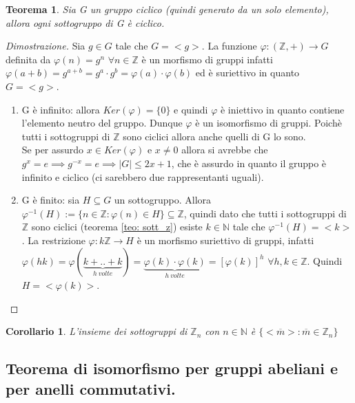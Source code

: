\documentclass{article}
\theoremstyle{definition}
\theoremstyle{plain}
\theoremstyle{plain}
\newtheorem{corollario}{Corollario}
\theoremstyle{plain}
\newtheorem{teorema}{Teorema}
\theoremstyle{plain}
\begin{document}
\begin{teorema}\label{teo:sott_cicl}
    Sia G un gruppo ciclico (quindi generato da un solo elemento), allora ogni sottogruppo di G è ciclico. 
\end{teorema}
\begin{proof}[Dimostrazione]
    Sia $g \in G$ tale che $G = <g>$.
    La funzione $\varphi : (\mathbb{Z}, +) \rightarrow G$ definita da $\varphi (n) = g^n$ $\forall n \in \mathbb{Z}$ è un morfismo di gruppi infatti $\varphi(a+b) = g^{a+b} = g^a \cdot g^b = \varphi(a) \cdot \varphi(b)$ ed è suriettivo in quanto $G = <g>$.
    \begin{enumerate}
        \item G è infinito: allora $Ker(\varphi) = \{0\}$ e quindi $\varphi$ è iniettivo in quanto contiene l'elemento neutro del gruppo. Dunque $\varphi$ è un isomorfismo di gruppi. Poichè tutti i sottogruppi di $\mathbb{Z}$ sono ciclici allora anche quelli di G lo sono.\\
        Se per assurdo $x \in Ker(\varphi)$ e $x \neq 0$ allora si avrebbe che $g^x = e \implies g^{-x} = e \implies |G| \le 2x + 1$, che è assurdo in quanto il gruppo è infinito e ciclico (ci sarebbero due rappresentanti uguali). 
        \item G è finito: sia $H \subseteq G$ un sottogruppo. Allora $\varphi^{-1}(H) := \{n \in \mathbb{Z} : \varphi(n) \in H\} \subseteq \mathbb{Z}$, quindi dato che tutti i sottogruppi di $\mathbb{Z}$ sono ciclici (teorema \ref{teo: sott_z}) esiste $k \in \mathbb{N}$ tale che $\varphi^{-1}(H) = <k>$. \newline
        La restrizione $\varphi : k\mathbb{Z} \rightarrow H$ è un morfismo suriettivo di gruppi, infatti $\varphi(hk) = \varphi(\underbrace{k + .. + k}_{h\ volte} ) = \underbrace{\varphi(k) \cdot \varphi(k)}_{h\ volte} = [\varphi(k)]^h$ $\forall h, k \in \mathbb{Z}$. Quindi $H = <\varphi(k)>$.
    \end{enumerate}
\end{proof}
\begin{corollario}
    L'insieme dei sottogruppi di $\mathbb{Z}_n$ con $n \in \mathbb{N}$ è $\{<\overline{m}> : \overline{m} \in \mathbb{Z}_n\}$
\end{corollario}
\subsection{Teorema di isomorfismo per gruppi abeliani e per anelli commutativi.}
\end{document}
